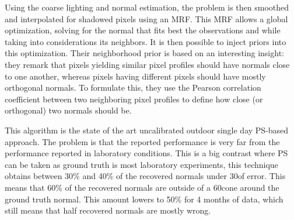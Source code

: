 Using the coarse lighting and normal estimation, the problem is then smoothed and interpolated for shadowed pixels using an MRF. This MRF allows a global optimization, solving for the normal that fits best the observations and while taking into considerations its neighbors. It is then possible to inject priors into this optimization. Their neighborhood prior is based on an interesting insight: they remark that pixels yielding similar pixel profiles should have normals close to one another, whereas pixels having different pixels should have mostly orthogonal normals. To formulate this, they use the Pearson correlation coefficient between two neighboring pixel profiles to define how close (or orthogonal) two normals should be.

This algorithm is the state of the art uncalibrated outdoor single day PS-based approach. The problem is that the reported performance is very far from the performance reported in laboratory conditions. This is a big contrast where PS can be taken as ground truth is most laboratory experiments, this technique obtains between 30\% and 40\% of the recovered normals under 30\degree of error. This means that 60\% of the recovered normals are outside of a 60\degree cone around the ground truth normal. This amount lowers to 50\% for 4 months of data, which still means that half recovered normals are mostly wrong.




